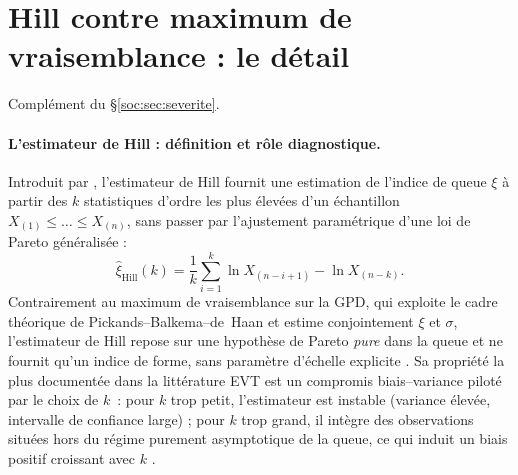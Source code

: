 \section{Hill contre maximum de vraisemblance : le détail}
\label{sec:ann-hill}


Complément du \S\ref{soc:sec:severite}.

\paragraph{L'estimateur de Hill : définition et rôle diagnostique.}
Introduit par \citet{Hill1975}, l'estimateur de Hill fournit une estimation
de l'indice de queue $\xi$ à partir des $k$ statistiques d'ordre les plus
élevées d'un échantillon $X_{(1)} \leq \dots \leq X_{(n)}$, sans passer par
l'ajustement paramétrique d'une loi de Pareto généralisée :
\begin{equation}
\hat{\xi}_{\text{Hill}}(k) = \frac{1}{k}\sum_{i=1}^{k}
\ln X_{(n-i+1)} - \ln X_{(n-k)}.
\label{soc:eq:hill}
\end{equation}
Contrairement au maximum de vraisemblance sur la GPD, qui exploite le cadre
théorique de Pickands--Balkema--de~Haan et estime conjointement $\xi$ et
$\sigma$, l'estimateur de Hill repose sur une hypothèse de Pareto \emph{pure}
dans la queue et ne fournit qu'un indice de forme, sans paramètre d'échelle
explicite \citep{Beirlant2004}. Sa propriété la plus documentée dans la
littérature EVT est un compromis biais--variance piloté par le choix de
$k$~: pour $k$ trop petit, l'estimateur est instable (variance élevée,
intervalle de confiance large) ; pour $k$ trop grand, il intègre des
observations situées hors du régime purement asymptotique de la queue, ce
qui induit un biais positif croissant avec $k$ \citep{Embrechts1997,
Beirlant2004}.

